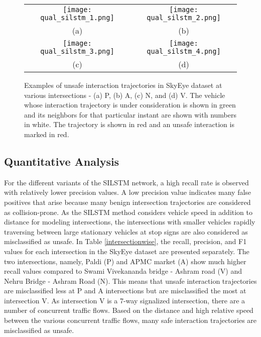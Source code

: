 \documentclass[final,journal]{IEEEtran}
\begin{document}
\begin{figure*}[htbp]
    \centering
    \begin{tabular}{cc}
         \texttt{[image: qual\_silstm\_1.png]}&
         \texttt{[image: qual\_silstm\_2.png]}\\
         (a) & (b) \\
         \texttt{[image: qual\_silstm\_3.png]}&
         \texttt{[image: qual\_silstm\_4.png]}\\
         (c) & (d)
    \end{tabular}
    \caption{Examples of unsafe interaction trajectories in SkyEye dataset at various intersections - (a) P, (b) A, (c) N, and (d) V. The vehicle whose interaction trajectory is under consideration is shown in green and its neighbors for that particular instant are shown with numbers in white. The trajectory is shown in red and an unsafe interaction is marked in red.}
    \label{visualsilstm}
\end{figure*}





\subsection{Quantitative Analysis}
For the different variants of the SILSTM network, a high recall rate is observed with relatively lower precision values. A low precision value indicates many false positives that arise because many benign intersection trajectories are considered as collision-prone. As the SILSTM method considers vehicle speed in addition to distance for modeling intersections, the intersections with smaller vehicles rapidly traversing between large stationary vehicles at stop signs are also considered as misclassified as unsafe. In Table \ref{intersectionwise}, the recall, precision, and F1 values for each intersection in the SkyEye dataset are presented separately. The two intersections, namely, Paldi (P) and APMC market (A) show much higher recall values compared to Swami Vivekananda bridge - Ashram road (V) and Nehru Bridge - Ashram Road (N). This means that unsafe interaction trajectories are misclassified less at P and A intersections but are misclassified the most at intersection V. As intersection V is a 7-way signalized intersection, there are a number of concurrent traffic flows. Based on the distance and high relative speed between the various concurrent traffic flows, many safe interaction trajectories are misclassified as unsafe. 
\end{document}
